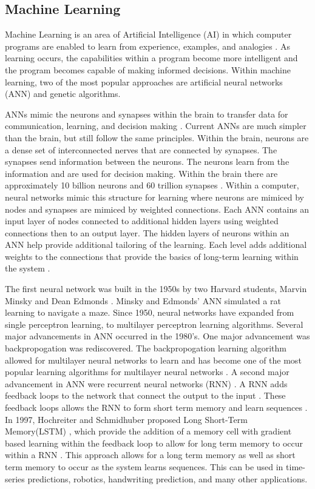 \documentclass[../main.tex]{subfiles}
\begin{document}
\subsection{Machine Learning}
%
Machine Learning is an area of Artificial Intelligence (AI)  in which computer programs are enabled to learn from experience, examples, and analogies \cite{AI_book}. As learning occurs, the capabilities within a program 
become more intelligent and the program becomes capable of making informed decisions. 
Within machine learning, two of the most popular approaches are artificial neural networks (ANN)  and genetic algorithms.

ANNs mimic the neurons and synapses within the brain to transfer data for communication, learning, and decision making \cite{AI_book}. Current ANNs are much simpler than the brain, but still follow the same principles. Within the brain, neurons are a dense set of interconnected nerves that are connected by synapses. The synapses send information between the neurons. The neurons learn from the information and are used for decision making. Within the brain there are approximately 10 billion neurons and 60 trillion synapses \cite{AI_book}. Within a computer, neural networks mimic this structure for learning where neurons are mimiced by nodes and synapses are mimiced by weighted connections. Each ANN contains an input layer of nodes connected to additional hidden layers using weighted connections then to an output layer. The hidden layers of neurons within an ANN help provide additional tailoring of the learning. Each level adds additional weights to the connections that provide the basics of long-term learning within the system \cite{AI_book}.

The first neural network was built in the 1950s by two Harvard students, Marvin Minsky and Dean Edmonds \cite{AI-modern-app}. Minsky and Edmonds' ANN simulated a rat learning to navigate a maze. Since 1950, neural networks have expanded from single perceptron learning, to multilayer perceptron learning algorithms. Several major advancements in ANN occurred in the 1980's. One major advancement was backpropogation was rediscovered. The backpropogation learning algorithm allowed for multilayer neural networks to learn and has become one of the most popular learning algorithms for multilayer neural networks \cite{AI_book}.  A second major advancement in ANN were recurrent neural networks (RNN) . A RNN adds feedback loops to the network that connect the output to the input \cite{AI_book}. These feedback loops allows the RNN to form short term memory and learn sequences \cite{mikolov2010recurrent}. In 1997, Hochreiter and Schmidhuber proposed Long Short-Term Memory(LSTM) , which provide the addition of a memory cell with gradient based learning within the feedback loop to allow for long term memory to occur within a RNN \cite{DBLP:journals/neco/HochreiterS97}. This approach allows for a long term memory as well as short term memory to occur as the system learns sequences. This can be used in time-series predictions, robotics, handwriting prediction, and many other applications.
\end{document}
